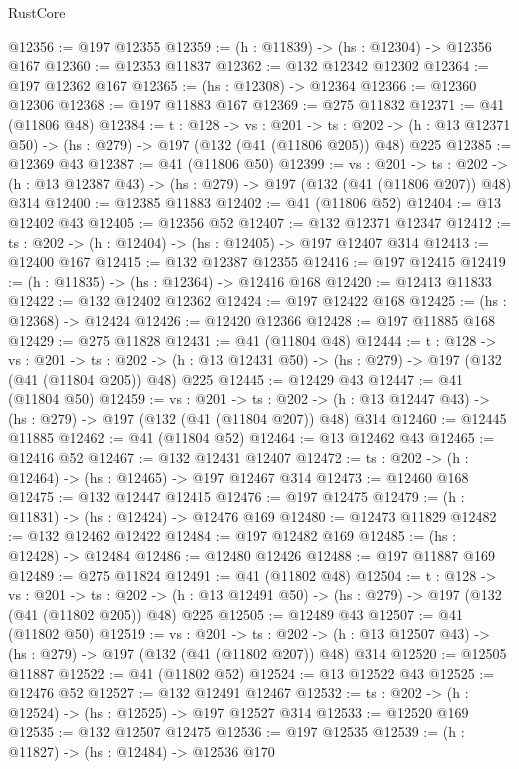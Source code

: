 \begin{lexlean}{RustCore}
\begin{coremodule}
@12356 := @197 @12355
@12359 := (h : @11839) -> (hs : @12304) -> @12356 @167
@12360 := @12353 @11837
@12362 := @132 @12342 @12302
@12364 := @197 @12362 @167
@12365 := (hs : @12308) -> @12364
@12366 := @12360 @12306
@12368 := @197 @11883 @167
@12369 := @275 @11832
@12371 := @41 (@11806 @48)
@12384 := {t : @128} ->
  {vs : @201} ->
  {ts : @202} -> (h : @13 @12371 @50) -> (hs : @279) -> @197 (@132 (@41 (@11806 @205)) @48) @225
@12385 := @12369 @43
@12387 := @41 (@11806 @50)
@12399 := {vs : @201} ->
  {ts : @202} -> (h : @13 @12387 @43) -> (hs : @279) -> @197 (@132 (@41 (@11806 @207)) @48) @314
@12400 := @12385 @11883
@12402 := @41 (@11806 @52)
@12404 := @13 @12402 @43
@12405 := @12356 @52
@12407 := @132 @12371 @12347
@12412 := {ts : @202} -> (h : @12404) -> (hs : @12405) -> @197 @12407 @314
@12413 := @12400 @167
@12415 := @132 @12387 @12355
@12416 := @197 @12415
@12419 := (h : @11835) -> (hs : @12364) -> @12416 @168
@12420 := @12413 @11833
@12422 := @132 @12402 @12362
@12424 := @197 @12422 @168
@12425 := (hs : @12368) -> @12424
@12426 := @12420 @12366
@12428 := @197 @11885 @168
@12429 := @275 @11828
@12431 := @41 (@11804 @48)
@12444 := {t : @128} ->
  {vs : @201} ->
  {ts : @202} -> (h : @13 @12431 @50) -> (hs : @279) -> @197 (@132 (@41 (@11804 @205)) @48) @225
@12445 := @12429 @43
@12447 := @41 (@11804 @50)
@12459 := {vs : @201} ->
  {ts : @202} -> (h : @13 @12447 @43) -> (hs : @279) -> @197 (@132 (@41 (@11804 @207)) @48) @314
@12460 := @12445 @11885
@12462 := @41 (@11804 @52)
@12464 := @13 @12462 @43
@12465 := @12416 @52
@12467 := @132 @12431 @12407
@12472 := {ts : @202} -> (h : @12464) -> (hs : @12465) -> @197 @12467 @314
@12473 := @12460 @168
@12475 := @132 @12447 @12415
@12476 := @197 @12475
@12479 := (h : @11831) -> (hs : @12424) -> @12476 @169
@12480 := @12473 @11829
@12482 := @132 @12462 @12422
@12484 := @197 @12482 @169
@12485 := (hs : @12428) -> @12484
@12486 := @12480 @12426
@12488 := @197 @11887 @169
@12489 := @275 @11824
@12491 := @41 (@11802 @48)
@12504 := {t : @128} ->
  {vs : @201} ->
  {ts : @202} -> (h : @13 @12491 @50) -> (hs : @279) -> @197 (@132 (@41 (@11802 @205)) @48) @225
@12505 := @12489 @43
@12507 := @41 (@11802 @50)
@12519 := {vs : @201} ->
  {ts : @202} -> (h : @13 @12507 @43) -> (hs : @279) -> @197 (@132 (@41 (@11802 @207)) @48) @314
@12520 := @12505 @11887
@12522 := @41 (@11802 @52)
@12524 := @13 @12522 @43
@12525 := @12476 @52
@12527 := @132 @12491 @12467
@12532 := {ts : @202} -> (h : @12524) -> (hs : @12525) -> @197 @12527 @314
@12533 := @12520 @169
@12535 := @132 @12507 @12475
@12536 := @197 @12535
@12539 := (h : @11827) -> (hs : @12484) -> @12536 @170

\end{coremodule}
\end{lexlean}
